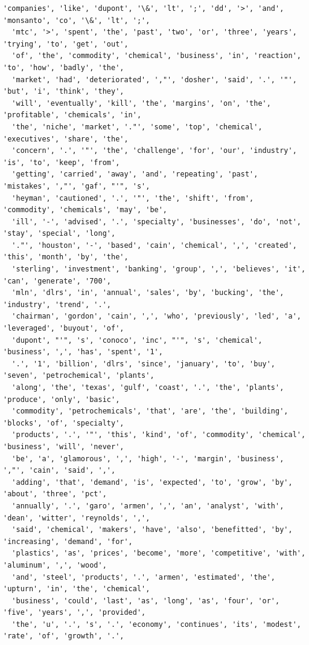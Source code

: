 \documentclass[18pt]{article}
\begin{document}
\begin{Verbatim}[commandchars=\\\{\}]
  'companies', 'like', 'dupont', '\&', 'lt', ';', 'dd', '>', 'and', 'monsanto', 'co', '\&', 'lt', ';',
  'mtc', '>', 'spent', 'the', 'past', 'two', 'or', 'three', 'years', 'trying', 'to', 'get', 'out',
  'of', 'the', 'commodity', 'chemical', 'business', 'in', 'reaction', 'to', 'how', 'badly', 'the',
  'market', 'had', 'deteriorated', ',"', 'dosher', 'said', '.', '"', 'but', 'i', 'think', 'they',
  'will', 'eventually', 'kill', 'the', 'margins', 'on', 'the', 'profitable', 'chemicals', 'in',
  'the', 'niche', 'market', '."', 'some', 'top', 'chemical', 'executives', 'share', 'the',
  'concern', '.', '"', 'the', 'challenge', 'for', 'our', 'industry', 'is', 'to', 'keep', 'from',
  'getting', 'carried', 'away', 'and', 'repeating', 'past', 'mistakes', ',"', 'gaf', "'", 's',
  'heyman', 'cautioned', '.', '"', 'the', 'shift', 'from', 'commodity', 'chemicals', 'may', 'be',
  'ill', '-', 'advised', '.', 'specialty', 'businesses', 'do', 'not', 'stay', 'special', 'long',
  '."', 'houston', '-', 'based', 'cain', 'chemical', ',', 'created', 'this', 'month', 'by', 'the',
  'sterling', 'investment', 'banking', 'group', ',', 'believes', 'it', 'can', 'generate', '700',
  'mln', 'dlrs', 'in', 'annual', 'sales', 'by', 'bucking', 'the', 'industry', 'trend', '.',
  'chairman', 'gordon', 'cain', ',', 'who', 'previously', 'led', 'a', 'leveraged', 'buyout', 'of',
  'dupont', "'", 's', 'conoco', 'inc', "'", 's', 'chemical', 'business', ',', 'has', 'spent', '1',
  '.', '1', 'billion', 'dlrs', 'since', 'january', 'to', 'buy', 'seven', 'petrochemical', 'plants',
  'along', 'the', 'texas', 'gulf', 'coast', '.', 'the', 'plants', 'produce', 'only', 'basic',
  'commodity', 'petrochemicals', 'that', 'are', 'the', 'building', 'blocks', 'of', 'specialty',
  'products', '.', '"', 'this', 'kind', 'of', 'commodity', 'chemical', 'business', 'will', 'never',
  'be', 'a', 'glamorous', ',', 'high', '-', 'margin', 'business', ',"', 'cain', 'said', ',',
  'adding', 'that', 'demand', 'is', 'expected', 'to', 'grow', 'by', 'about', 'three', 'pct',
  'annually', '.', 'garo', 'armen', ',', 'an', 'analyst', 'with', 'dean', 'witter', 'reynolds', ',',
  'said', 'chemical', 'makers', 'have', 'also', 'benefitted', 'by', 'increasing', 'demand', 'for',
  'plastics', 'as', 'prices', 'become', 'more', 'competitive', 'with', 'aluminum', ',', 'wood',
  'and', 'steel', 'products', '.', 'armen', 'estimated', 'the', 'upturn', 'in', 'the', 'chemical',
  'business', 'could', 'last', 'as', 'long', 'as', 'four', 'or', 'five', 'years', ',', 'provided',
  'the', 'u', '.', 's', '.', 'economy', 'continues', 'its', 'modest', 'rate', 'of', 'growth', '.',

\end{Verbatim}
\end{document}
